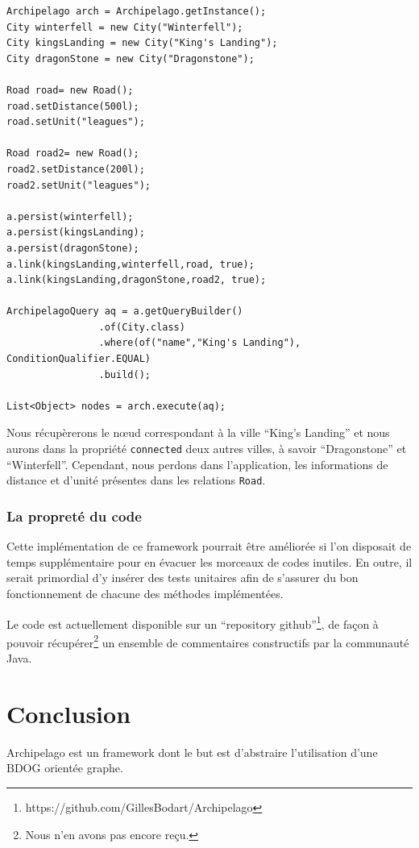 \documentclass[a4paper,fleqn,12pt]{report}
\begin{document}
\begin{lstlisting}
Archipelago arch = Archipelago.getInstance();
City winterfell = new City("Winterfell");
City kingsLanding = new City("King's Landing");
City dragonStone = new City("Dragonstone");

Road road= new Road();
road.setDistance(500l);
road.setUnit("leagues");

Road road2= new Road();
road2.setDistance(200l);
road2.setUnit("leagues");

a.persist(winterfell);
a.persist(kingsLanding);
a.persist(dragonStone);
a.link(kingsLanding,winterfell,road, true);
a.link(kingsLanding,dragonStone,road2, true);

ArchipelagoQuery aq = a.getQueryBuilder()
                .of(City.class)
                .where(of("name","King's Landing"), ConditionQualifier.EQUAL)
                .build();
                
List<Object> nodes = arch.execute(aq);
\end{lstlisting}

Nous récupèrerons le nœud correspondant à la ville \enquote{King's Landing} et nous aurons dans la propriété \texttt{connected} deux autres villes, à savoir \enquote{Dragonstone} et \enquote{Winterfell}. Cependant, nous perdons dans l'application, les informations de distance et d'unité présentes dans les relations \texttt{Road}.


\subsection{La propreté du code}

Cette implémentation de ce framework pourrait être améliorée si l'on disposait de temps supplémentaire pour en évacuer les morceaux de codes inutiles. En outre, il serait primordial d'y insérer des tests unitaires afin de s'assurer du bon fonctionnement de chacune des méthodes implémentées.

Le code est actuellement disponible sur un \enquote{repository github}\footnote{https://github.com/GillesBodart/Archipelago}, de façon à pouvoir récupérer\footnote{Nous n'en avons pas encore reçu.} un ensemble de commentaires constructifs par la communauté Java. 

\chapter{Conclusion}


Archipelago est un framework dont le but est d'abstraire l'utilisation d'une BDOG orientée graphe. 
\end{document}

